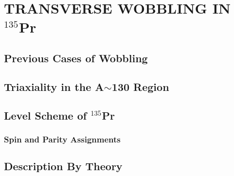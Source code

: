 %
%

\chapter{TRANSVERSE WOBBLING IN $^{135}$Pr}
\label{chp:trw}

\section{Previous Cases of Wobbling}
\label{sec:trw-prev}

\section{Triaxiality in the A$\sim$130 Region}
\label{sec:trw-triax}

\section{Level Scheme of $^{135}$Pr}
\label{sec:trw-lvl-scheme}

\subsection{Spin and Parity Assignments}
\label{ssec:trw-lvl-scheme-assignments}

\section{Description By Theory}
\label{sec:trw-theory-desc}